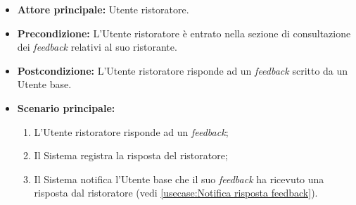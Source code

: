 \label{usecase:Risposta ad un feedback}
\begin{itemize}
	\item \textbf{Attore principale:} Utente ristoratore.

	\item \textbf{Precondizione:} L'Utente ristoratore è entrato nella sezione di consultazione dei \textit{feedback} relativi al suo ristorante.

	\item \textbf{Postcondizione:} L'Utente ristoratore risponde ad un \textit{feedback} scritto da un Utente base.


	\item \textbf{Scenario principale:}
	      \begin{enumerate}
		      \item L'Utente ristoratore risponde ad un \textit{feedback};
		      \item Il Sistema registra la risposta del ristoratore;
		      \item Il Sistema notifica l'Utente base che il suo \textit{feedback} ha ricevuto una risposta dal ristoratore (vedi \autoref{usecase:Notifica risposta feedback}).

	      \end{enumerate}
\end{itemize}

